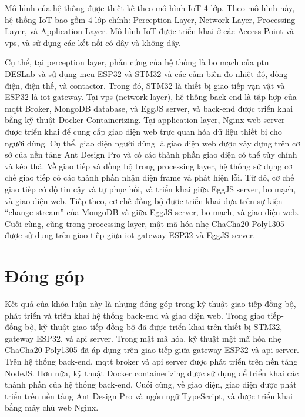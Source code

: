Mô hình của hệ thống được thiết kế theo mô hình IoT 4 lớp. Theo mô hình này, hệ thống IoT bao gồm 4 lớp chính: Perception Layer, Network Layer, Processing Layer, và Application Layer. Mô hình IoT được triển khai ở các Access Point và \acrshort{vps}, và sử dụng các kết nối có dây và không dây.

Cụ thể, tại perception layer, phần cứng của hệ thống là bo mạch của \acrfull{ptn} DESLab và sử dụng \acrshort{mcu} ESP32 và STM32 và các cảm biến đo nhiệt độ, dòng điện, điện thế, và contactor. Trong đó, STM32 là thiết bị giao tiếp vạn vật và ESP32 là \acrshort{iot} gateway.
% 
Tại \acrshort{vps} (network layer), hệ thống back-end là tập hợp của \acrfull{mqtt} Broker, MongoDB database, và EggJS server, và back-end được triển khai bằng kỹ thuật Docker Containerizing. Tại application layer, Nginx web-server được triển khai để cung cấp giao diện web trực quan hóa dữ liệu thiết bị cho người dùng.
%
Cụ thể, giao diện người dùng là giao diện web được xây dựng trên cơ sở của nền tảng Ant Design Pro và có các thành phần giao diện có thể tùy chỉnh và kéo thả.
%
Về giao tiếp và đồng bộ trong processing layer, hệ thống sử dụng cơ chế giao tiếp có các thành phần nhận diện frame và phát hiện lỗi. Từ đó, cơ chế giao tiếp có độ tin cậy và tự phục hồi, và triển khai giữa EggJS server, bo mạch, và giao diện web.
%
Tiếp theo, cơ chế đồng bộ được triển khai dựa trên sự kiện ``change stream'' của MongoDB và giữa EggJS server, bo mạch, và giao diện web.
%
Cuối cùng, cũng trong processing layer, mật mã hóa nhẹ ChaCha20-Poly1305 được sử dụng trên giao tiếp giữa \acrshort{iot} gateway ESP32 và EggJS server.

\section{Đóng góp}

Kết quả của khóa luận này là những đóng góp trong kỹ thuật giao tiếp-đồng bộ, phát triển và triển khai hệ thống back-end và giao diện web. Trong giao tiếp-đồng bộ, kỹ thuật giao tiếp-đồng bộ đã được triển khai trên thiết bị STM32, gateway ESP32, và \acrshort{api} server. Trong mật mã hóa, kỹ thuật mật mã hóa nhẹ ChaCha20-Poly1305 đã áp dụng trên giao tiếp giữa gateway ESP32 và \acrshort{api} server. Trên hệ thống back-end, \acrshort{mqtt} broker và \acrshort{api} server được phát triển trên nền tảng NodeJS. Hơn nữa, kỹ thuật Docker containerizing được sử dụng để triển khai các thành phần của hệ thống back-end. Cuối cùng, về giao diện, giao diện được phát triển trên nền tảng Ant Design Pro và ngôn ngữ TypeScript, và được triển khai bằng máy chủ web Nginx.

